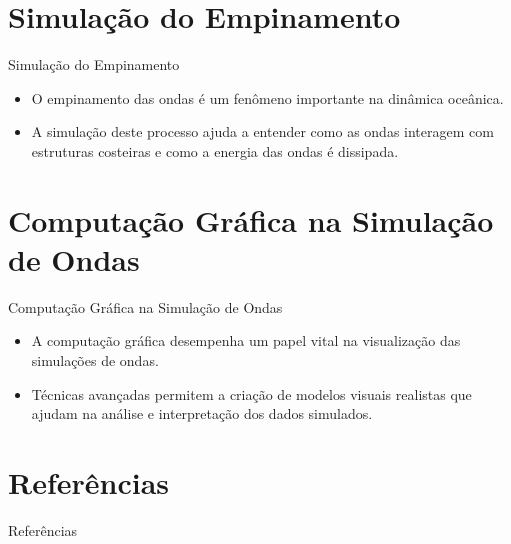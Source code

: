 \documentclass[aspectratio=169,xcolor=table]{beamer}
\begin{document}
\section{Simulação do Empinamento}
\begin{frame}{Simulação do Empinamento}
    \begin{itemize}
        \item O empinamento das ondas é um fenômeno importante na dinâmica oceânica.
        \item A simulação deste processo ajuda a entender como as ondas interagem com estruturas costeiras e como a energia das ondas é dissipada.
    \end{itemize}
\end{frame}

\section{Computação Gráfica na Simulação de Ondas}
\begin{frame}{Computação Gráfica na Simulação de Ondas}
    \begin{itemize}
        \item A computação gráfica desempenha um papel vital na visualização das simulações de ondas.
        \item Técnicas avançadas permitem a criação de modelos visuais realistas que ajudam na análise e interpretação dos dados simulados.
    \end{itemize}
\end{frame}

\section{Referências}
\begin{frame}[allowframebreaks]{Referências}
    
    
\end{frame}
\end{document}
